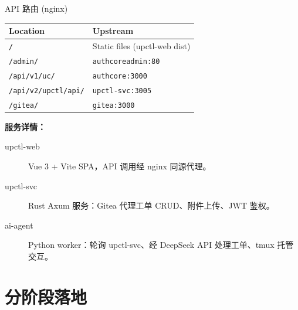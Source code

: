 \documentclass[12pt,aspectratio=169,utf8]{beamer}
\begin{document}
\begin{frame}[fragile]{API 路由 (nginx)}
  \begin{table}
    \fontsize{9}{11}\selectfont
    \begin{tabular}{ll}
      \toprule
      Location & Upstream \\
      \midrule
      \texttt{/} & Static files (upctl-web dist) \\
      \texttt{/admin/} & \texttt{authcoreadmin:80} \\
      \texttt{/api/v1/uc/} & \texttt{authcore:3000} \\
      \texttt{/api/v2/upctl/api/} & \texttt{upctl-svc:3005} \\
      \texttt{/gitea/} & \texttt{gitea:3000} \\
      \bottomrule
    \end{tabular}
  \end{table}

  \vspace{6pt}
  \textbf{服务详情：}
  \begin{description}
    \item[upctl-web] Vue 3 + Vite SPA，API 调用经 nginx 同源代理。
    \item[upctl-svc] Rust Axum 服务：Gitea 代理工单 CRUD、附件上传、JWT 鉴权。
    \item[ai-agent] Python worker：轮询 upctl-svc、经 DeepSeek API 处理工单、tmux 托管交互。
  \end{description}
\end{frame}

\section{分阶段落地}
\end{document}
